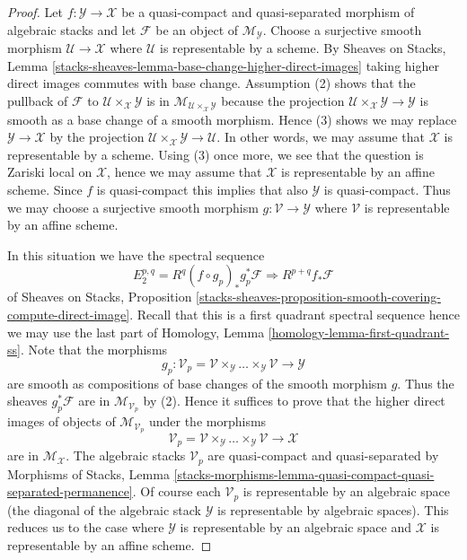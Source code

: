 \begin{proof}
Let $f : \mathcal{Y} \to \mathcal{X}$ be a quasi-compact and quasi-separated
morphism of algebraic stacks and let $\mathcal{F}$ be an object of
$\mathcal{M}_\mathcal{Y}$. Choose a surjective smooth morphism
$\mathcal{U} \to \mathcal{X}$ where $\mathcal{U}$ is representable by
a scheme. By
Sheaves on Stacks, Lemma
\ref{stacks-sheaves-lemma-base-change-higher-direct-images}
taking higher direct images commutes with base change.
Assumption (2) shows that the pullback of $\mathcal{F}$
to $\mathcal{U} \times_\mathcal{X} \mathcal{Y}$ is in
$\mathcal{M}_{\mathcal{U} \times_\mathcal{X} \mathcal{Y}}$
because the projection
$\mathcal{U} \times_\mathcal{X} \mathcal{Y} \to \mathcal{Y}$
is smooth as a base change of a smooth morphism. Hence (3) shows we may
replace $\mathcal{Y} \to \mathcal{X}$ by the projection
$\mathcal{U} \times_\mathcal{X} \mathcal{Y} \to \mathcal{U}$.
In other words, we may assume that $\mathcal{X}$
is representable by a scheme.
Using (3) once more, we see that the question is Zariski local on
$\mathcal{X}$, hence we may assume that $\mathcal{X}$ is representable by
an affine scheme. Since $f$ is quasi-compact this implies that also
$\mathcal{Y}$ is quasi-compact. Thus we may choose a surjective smooth
morphism $g : \mathcal{V} \to \mathcal{Y}$ where $\mathcal{V}$ is representable
by an affine scheme.

\medskip\noindent
In this situation we have the spectral sequence
$$
E_2^{p, q} = R^q(f \circ g_p)_*g_p^*\mathcal{F}
\Rightarrow
R^{p + q}f_*\mathcal{F}
$$
of
Sheaves on Stacks, Proposition
\ref{stacks-sheaves-proposition-smooth-covering-compute-direct-image}.
Recall that this is a first quadrant spectral sequence hence we may
use the last part of Homology, Lemma \ref{homology-lemma-first-quadrant-ss}.
Note that the morphisms
$$
g_p : \mathcal{V}_p =
\mathcal{V} \times_\mathcal{Y} \ldots \times_\mathcal{Y} \mathcal{V}
\longrightarrow
\mathcal{Y}
$$
are smooth as compositions of base changes of the smooth morphism $g$.
Thus the sheaves $g_p^*\mathcal{F}$ are in
$\mathcal{M}_{\mathcal{V}_p}$ by (2). Hence it suffices to prove that the
higher direct images of objects of $\mathcal{M}_{\mathcal{V}_p}$ under
the morphisms
$$
\mathcal{V}_p =
\mathcal{V} \times_\mathcal{Y} \ldots \times_\mathcal{Y} \mathcal{V}
\longrightarrow
\mathcal{X}
$$
are in $\mathcal{M}_\mathcal{X}$. The algebraic stacks $\mathcal{V}_p$
are quasi-compact and quasi-separated by
Morphisms of Stacks, Lemma
\ref{stacks-morphisms-lemma-quasi-compact-quasi-separated-permanence}.
Of course each $\mathcal{V}_p$ is representable by an algebraic space
(the diagonal of the algebraic stack $\mathcal{Y}$ is representable
by algebraic spaces). This reduces us to the case where
$\mathcal{Y}$ is representable by an algebraic space and $\mathcal{X}$
is representable by an affine scheme.


\end{proof}
